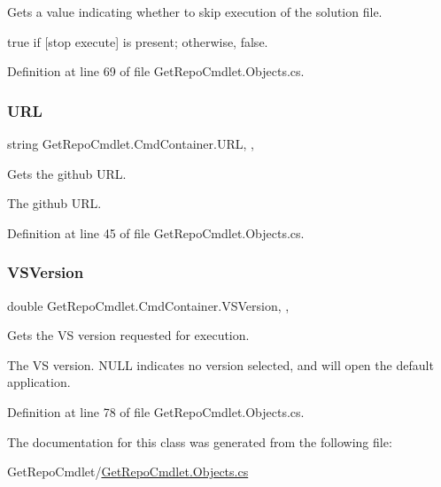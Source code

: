 Gets a value indicating whether to skip execution of the solution file. 

{\ttfamily true} if \mbox{[}stop execute\mbox{]} is present; otherwise, {\ttfamily false}. 

Definition at line 69 of file Get\+Repo\+Cmdlet.\+Objects.\+cs.

\mbox{\label{class_get_repo_cmdlet_1_1_cmd_container_a57d88a0a01ee850f4a971e0063a8df8f}} 
\subsubsection{\texorpdfstring{U\+RL}{URL}}
{\footnotesize\ttfamily string Get\+Repo\+Cmdlet.\+Cmd\+Container.\+U\+RL\hspace{0.3cm}{\ttfamily [get]}, {}, {\ttfamily [package]}}



Gets the github U\+RL. 

The github U\+RL. 

Definition at line 45 of file Get\+Repo\+Cmdlet.\+Objects.\+cs.

\mbox{\label{class_get_repo_cmdlet_1_1_cmd_container_aa3c4d3c76b60c871e174d0e971c7b6d4}} 
\subsubsection{\texorpdfstring{V\+S\+Version}{VSVersion}}
{\footnotesize\ttfamily double Get\+Repo\+Cmdlet.\+Cmd\+Container.\+V\+S\+Version\hspace{0.3cm}{\ttfamily [get]}, {}, {\ttfamily [package]}}



Gets the VS version requested for execution. 

The VS version. {\ttfamily N\+U\+LL} indicates no version selected, and will open the default application. 

Definition at line 78 of file Get\+Repo\+Cmdlet.\+Objects.\+cs.



The documentation for this class was generated from the following file\+:\begin{DoxyCompactItemize}
\item 
Get\+Repo\+Cmdlet/\mbox{\hyperlink{_get_repo_cmdlet_8_objects_8cs}{Get\+Repo\+Cmdlet.\+Objects.\+cs}}\end{DoxyCompactItemize}
